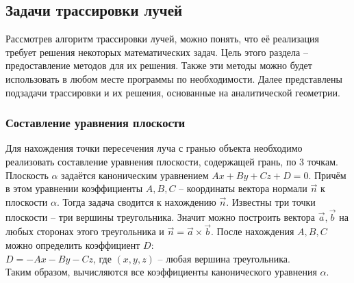 \subsection{Задачи трассировки лучей} {
    Рассмотрев алгоритм трассировки лучей, можно понять, что её реализация
    требует решения некоторых математических задач.
    Цель этого раздела -- предоставление методов для их решения.
    Также эти методы можно будет использовать
    в любом месте программы по необходимости.
    Далее представлены подзадачи трассировки и их решения, основанные на
    аналитической геометрии.
    
   \subsubsection{Составление уравнения плоскости} {
        Для нахождения точки пересечения луча с гранью объекта необходимо
        реализовать составление уравнения плоскости, содержащей грань, по 3 точкам.
        Плоскость $\alpha$ задаётся каноническим уравнением
        $Ax + By + Cz + D = 0$.
        Причём в этом уравнении коэффициенты $A, B, C$ -- координаты вектора нормали
        $\vec{n}$ к плоскости $\alpha$.
        Тогда задача сводится к нахождению $\vec{n}$.
        Известны три точки плоскости -- три вершины треугольника.
        Значит можно построить вектора $\vec{a}, \vec{b}$ на любых
        сторонах этого треугольника и $\vec{n} = \vec{a} \times \vec{b}$.
        После нахождения $A, B, C$ можно определить коэффициент $D$: \\
        $D = -Ax - By - Cz$, где $(x, y, z)$ -- любая вершина треугольника. \\
        Таким образом, вычисляются все коэффициенты канонического уравнения
        $\alpha$.
    }
}
